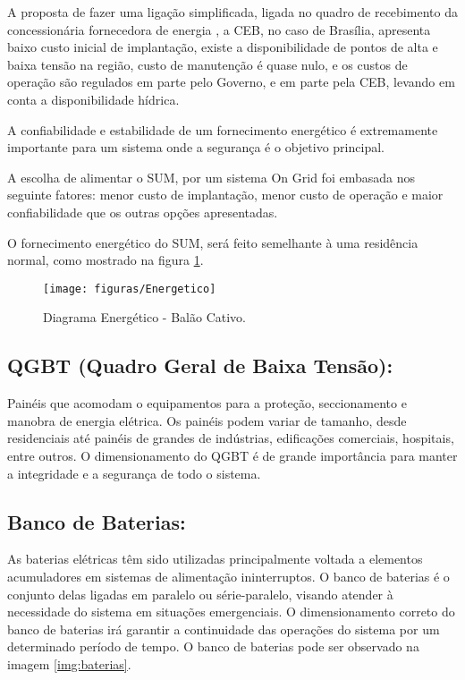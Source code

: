 A proposta de fazer uma ligação simplificada, ligada no quadro de recebimento da concessionária fornecedora de energia , a CEB, no caso de Brasília, apresenta baixo custo inicial de implantação, existe a disponibilidade de pontos de alta e baixa tensão na região, custo de manutenção é quase nulo,  e os custos de operação são regulados em parte pelo Governo, e em parte pela CEB, levando em conta a disponibilidade hídrica.

A confiabilidade e estabilidade de um fornecimento energético é extremamente importante para um sistema onde a segurança é o objetivo principal.

A escolha de alimentar o SUM, por um sistema On Grid foi embasada nos seguinte fatores: menor custo de implantação, menor custo de operação e maior confiabilidade que os outras opções apresentadas.

O fornecimento energético do SUM, será feito semelhante à uma residência normal, como mostrado na figura \ref{img:Energetico}.

\begin{figure}[H]
	\centering
	\caption{Diagrama Energético - Balão Cativo.}
	\texttt{[image: figuras/Energetico]}
	\label{img:Energetico}
\end{figure}

 \subsection{QGBT (Quadro Geral de Baixa Tensão):}
 Painéis que acomodam o equipamentos para a proteção, seccionamento e manobra de energia elétrica. Os painéis podem variar de tamanho, desde residenciais até painéis de grandes de indústrias, edificações comerciais, hospitais, entre outros. O dimensionamento do QGBT é de grande importância para manter a integridade e a segurança de todo o sistema.

\subsection{Banco de Baterias:}

As baterias elétricas têm sido utilizadas principalmente voltada a elementos acumuladores em sistemas de alimenta\c{c}ão ininterruptos. O banco de baterias é o conjunto delas ligadas em paralelo ou série-paralelo, visando atender à necessidade do sistema em situações emergenciais. O dimensionamento correto do banco de baterias irá garantir a continuidade das operações do sistema por um determinado período de tempo. O banco de baterias pode ser observado na imagem \ref{img:baterias}.


